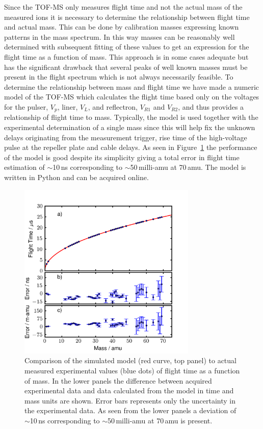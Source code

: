 \documentclass[aip,rsi]{revtex4-1}
\begin{document}
Since the TOF-MS only measures flight time and not the actual mass of the measured ions it is necessary to determine the relationship between flight time and actual mass. This can be done by calibration masses expressing known patterns in the mass spectrum. In this way masses can be reasonably well determined with subsequent fitting of these values to get an expression for the flight time as a function of mass. This approach is in some cases adequate but has the significant drawback that several peaks of well known masses must be present in the flight spectrum which is not always necessarily feasible. To determine the relationship between mass and flight time we have made a numeric model of the TOF-MS which calculates the flight time based only on the voltages for the pulser, $V_p$, liner, $V_L$, and reflectron, $V_{R1}$ and $V_{R2}$, and thus provides a relationship of flight time to mass. Typically, the model is used together with the experimental determination of a single mass since this will help fix the unknown delays originating from the measurement trigger, rise time of the high-voltage pulse at the repeller plate and cable delays. As seen in Figure~\ref{fig:model_error} the performance of the model is good despite its simplicity giving a total error in flight time estimation of $\sim$10\,ns corresponding to $\sim$50\,milli-amu at 70\,amu. The model is written in Python and can be acquired online\cite{ModelGithub}.
\begin{figure}
 \includegraphics[width=8.5cm]{model_error.png}%
 \caption{Comparison of the simulated model (red curve, top panel) to actual measured experimental values (blue dots) of flight time as a function of mass. In the lower panels the difference between acquired experimental data and data calculated from the model in time and mass units are shown. Error bars represents only the uncertainty in the experimental data. As seen from the lower panels a deviation of $\sim$10\,ns corresponding to $\sim$50\,milli-amu at 70\,amu is present.\label{fig:model_error}}%
\end{figure}
\end{document}
